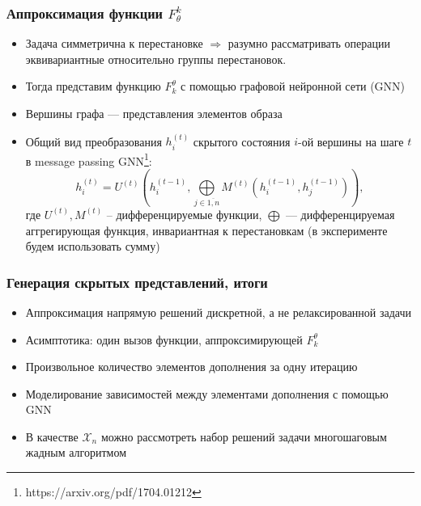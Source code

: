 \documentclass[10pt]{beamer}
\begin{document}
\begin{frame}
	\frametitle{Аппроксимация функции $F_\theta^k$}
		\begin{itemize}
			\item  Задача симметрична к перестановке $\Longrightarrow$ разумно рассматривать операции эквивариантные относительно группы перестановок.
			\item Тогда представим функцию $F_k^\theta$ с помощью графовой нейронной сети (GNN)
			\item Вершины графа --- представления элементов образа
			\item Общий вид преобразования $h_i^{(t)}$ скрытого состояния $i$-ой вершины на шаге $t$ в message passing GNN\footnote{https://arxiv.org/pdf/1704.01212}:
			$$h_i^{(t)} = U^{(t)} \left(h_i^{(t-1)}, \bigoplus\limits_{j\in \overline{1, n}}M^{(t)} \left(h_i^{(t-1)}, h_j^{(t-1)} \right) \right),$$
			где $U^{(t)}, M^{(t)}$ -- дифференцируемые функции, $\bigoplus$ --- дифференцируемая аггрегирующая функция, инвариантная к перестановкам (в эксперименте будем использовать сумму)
		\end{itemize}
\end{frame}

\begin{frame}
	\frametitle{Генерация скрытых представлений, итоги}
		\begin{itemize}
			\item Аппроксимация напрямую решений дискретной, а не релаксированной задачи
			\item Асимптотика: один вызов функции, аппроксимирующей $F_k^\theta$
			\item Произвольное количество элементов дополнения за одну итерацию
			\item Моделирование зависимостей между элементами дополнения с помощью GNN
			\item В качестве $\mathcal{X}_n$ можно рассмотреть набор решений задачи многошаговым жадным алгоритмом
		\end{itemize}
\end{frame}
\end{document}
